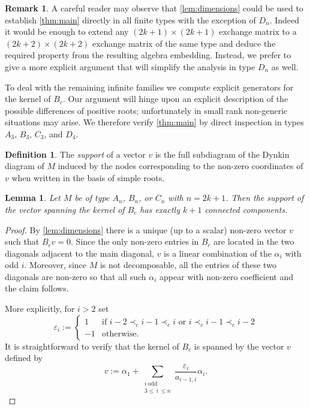 \documentclass[11pt]{amsart}
\newcommand{\A}{{M}}
\newtheorem{lemma}[theorem]{Lemma}
\theoremstyle{definition}
\newtheorem{remark}[theorem]{Remark}
\newtheorem{definition}[theorem]{Definition}
\numberwithin{equation}{section}
\numberwithin{figure}{section}
\begin{document}
  \begin{remark}
    \label{rk:induction}
    A careful reader may observe that \cref{lem:dimensions} could be used to establish \cref{thm:main} directly in all finite types with the exception of $D_n$. 
    Indeed it would be enough to extend any $(2k+1) \times (2k+1)$ exchange matrix to a $(2k+2)\times(2k+2)$ exchange matrix of the same type and deduce the required property from the resulting algebra embedding.
    Instead, we prefer to give a more explicit argument that will simplify the analysis in type $D_n$ as well.
  \end{remark}

  To deal with the remaining infinite families we compute explicit generators for the kernel of $B_c$. 
  Our argument will hinge upon an explicit description of the possible differences of positive roots; unfortunately in small rank non-generic situations may arise.
  We therefore verify \cref{thm:main} by direct inspection in types $A_3$, $B_3$, $C_3$, and $D_4$.

  \begin{definition}
    The \emph{support} of a vector $v$ is the full subdiagram of the Dynkin diagram of $\A$ induced by the nodes corresponding to the non-zero coordinates of $v$ when written in the basis of simple roots.
  \end{definition}

  \begin{lemma}
    Let $\A$ be of type $A_n$, $B_n$, or $C_n$ with $n=2k+1$.
    Then the support of the vector spanning the kernel of $B_c$ has exactly $k+1$ connected components. 
  \end{lemma} 
\say[PT]{}
  \begin{proof}
    By \cref{lem:dimensions} there is a unique (up to a scalar) non-zero vector $v$ such that $B_cv=0$.
    Since the only non-zero entries in $B_c$ are located in the two diagonals adjacent to the main diagonal, $v$ is a linear combination of the $\alpha_i$ with odd $i$.
    Moreover, since $\A$ is not decomposable, all the entries of these two diagonals are non-zero so that all such $\alpha_i$ appear with non-zero coefficient and the claim follows.
    
    More explicitly, for $i>2$ set 
    \[
      \varepsilon_i :=
      \begin{cases}
        1 & \text{if $i-2\prec_c i-1 \prec_c i$ or $i\prec_c i-1 \prec_c i-2$}\\
        -1 & \text{otherwise.}
      \end{cases}
    \]
    It is straightforward to verify that the kernel of $B_c$ is spanned by the vector $v$ defined by \say[PT]{}
    \begin{equation}
      \label{eq:vector}
      v := 
      \alpha_1 + \sum_{\substack{i\ \mathrm{odd}\\ 3\le\, i\,\leq n}} \frac{\varepsilon_i}{a_{i-1,i}} \alpha_i.
    \end{equation}
  \end{proof}
  
\end{document}
